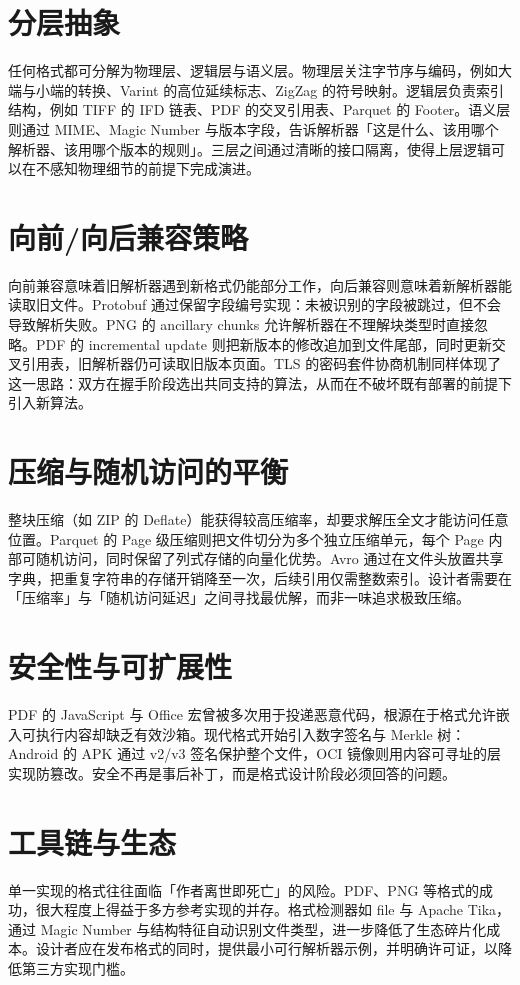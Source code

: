\section{分层抽象}
任何格式都可分解为物理层、逻辑层与语义层。物理层关注字节序与编码，例如大端与小端的转换、Varint 的高位延续标志、ZigZag 的符号映射。逻辑层负责索引结构，例如 TIFF 的 IFD 链表、PDF 的交叉引用表、Parquet 的 Footer。语义层则通过 MIME、Magic Number 与版本字段，告诉解析器「这是什么、该用哪个解析器、该用哪个版本的规则」。三层之间通过清晰的接口隔离，使得上层逻辑可以在不感知物理细节的前提下完成演进。\par
\section{向前/向后兼容策略}
向前兼容意味着旧解析器遇到新格式仍能部分工作，向后兼容则意味着新解析器能读取旧文件。Protobuf 通过保留字段编号实现：未被识别的字段被跳过，但不会导致解析失败。PNG 的 ancillary chunks 允许解析器在不理解块类型时直接忽略。PDF 的 incremental update 则把新版本的修改追加到文件尾部，同时更新交叉引用表，旧解析器仍可读取旧版本页面。TLS 的密码套件协商机制同样体现了这一思路：双方在握手阶段选出共同支持的算法，从而在不破坏既有部署的前提下引入新算法。\par
\section{压缩与随机访问的平衡}
整块压缩（如 ZIP 的 Deflate）能获得较高压缩率，却要求解压全文才能访问任意位置。Parquet 的 Page 级压缩则把文件切分为多个独立压缩单元，每个 Page 内部可随机访问，同时保留了列式存储的向量化优势。Avro 通过在文件头放置共享字典，把重复字符串的存储开销降至一次，后续引用仅需整数索引。设计者需要在「压缩率」与「随机访问延迟」之间寻找最优解，而非一味追求极致压缩。\par
\section{安全性与可扩展性}
PDF 的 JavaScript 与 Office 宏曾被多次用于投递恶意代码，根源在于格式允许嵌入可执行内容却缺乏有效沙箱。现代格式开始引入数字签名与 Merkle 树：Android 的 APK 通过 v2/v3 签名保护整个文件，OCI 镜像则用内容可寻址的层实现防篡改。安全不再是事后补丁，而是格式设计阶段必须回答的问题。\par
\section{工具链与生态}
单一实现的格式往往面临「作者离世即死亡」的风险。PDF、PNG 等格式的成功，很大程度上得益于多方参考实现的并存。格式检测器如 file 与 Apache Tika，通过 Magic Number 与结构特征自动识别文件类型，进一步降低了生态碎片化成本。设计者应在发布格式的同时，提供最小可行解析器示例，并明确许可证，以降低第三方实现门槛。\par
